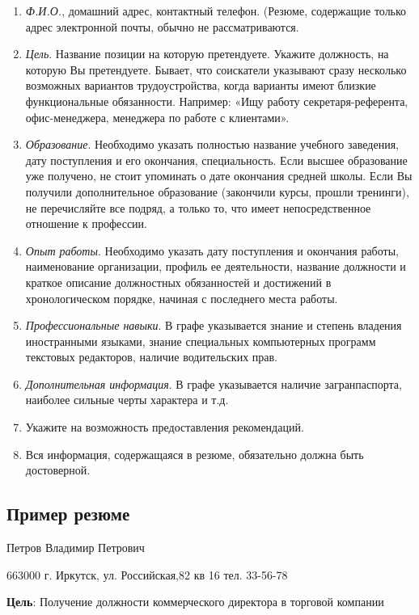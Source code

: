 \begin{enumerate}[noitemsep]
    \item \textit{Ф.И.О.}, домашний адрес, контактный телефон. (Резюме, содержащие только адрес электронной почты, обычно не рассматриваются.
    \item \textit{Цель}. Название позиции на которую претендуете. Укажите должность, на которую Вы претендуете. Бывает, что соискатели указывают сразу несколько возможных вариантов трудоустройства, когда варианты имеют близкие функциональные обязанности. Например: «Ищу работу секретаря-референта, офис-менеджера, менеджера по работе с клиентами».
    \item \textit{Образование}. Необходимо указать полностью название учебного заведения, дату поступления и его окончания, специальность. Если высшее образование уже получено, не стоит упоминать о дате окончания средней школы. Если Вы получили дополнительное образование (закончили курсы, прошли тренинги), не перечисляйте все подряд, а только то, что имеет непосредственное отношение к профессии.
    \item \textit{Опыт работы}. Необходимо указать дату поступления и окончания работы, наименование организации, профиль ее деятельности, название должности и краткое описание должностных обязанностей и достижений в хронологическом порядке, начиная с последнего места работы.
    \item \textit{Профессиональные навыки}. В графе указывается знание и степень владения иностранными языками, знание специальных компьютерных программ текстовых редакторов, наличие водительских прав.
    \item \textit{Дополнительная информация}. В графе указывается наличие загранпаспорта, наиболее сильные черты характера и т.д.
    \item Укажите на возможность предоставления рекомендаций.
    \item Вся информация, содержащаяся в резюме, обязательно должна быть достоверной.
\end{enumerate}

\subsection{Пример резюме}
Петров Владимир Петрович

663000 г. Иркутск, ул. Российская,82 кв 16 тел. 33-56-78

\textbf{Цель}: Получение должности коммерческого директора в торговой компании

